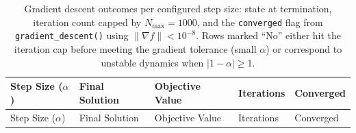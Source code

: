 \documentclass[
]{article}
\begin{document}
\begin{longtable}[]{@{}
  >{\raggedright\arraybackslash}p{}
  >{\raggedright\arraybackslash}p{}
  >{\raggedright\arraybackslash}p{}
  >{\raggedright\arraybackslash}p{}
  >{\raggedright\arraybackslash}p{}@{}}
\caption{Gradient descent outcomes per configured step size: state at
termination, iteration count capped by \(N_{\max} = 1000\), and the
\protect\texttt{converged} flag from
\protect\texttt{gradient\_descent()} using \(\|\nabla f\| < 10^{-8}\).
Rows marked ``No'' either hit the iteration cap before meeting the
gradient tolerance (small \(\alpha\)) or correspond to unstable dynamics
when \(|1-\alpha| \geq 1\). \label{tab:opt_results}}\tabularnewline
\toprule\noalign{}
\begin{minipage}[b]{\linewidth}\raggedright
Step Size (\texorpdfstring{\ensuremath{\alpha}}{alpha})
\end{minipage} & \begin{minipage}[b]{\linewidth}\raggedright
Final Solution
\end{minipage} & \begin{minipage}[b]{\linewidth}\raggedright
Objective Value
\end{minipage} & \begin{minipage}[b]{\linewidth}\raggedright
Iterations
\end{minipage} & \begin{minipage}[b]{\linewidth}\raggedright
Converged
\end{minipage} \\
\midrule\noalign{}
\endfirsthead
\toprule\noalign{}
\begin{minipage}[b]{\linewidth}\raggedright
Step Size (\texorpdfstring{\ensuremath{\alpha}}{alpha})
\end{minipage} & \begin{minipage}[b]{\linewidth}\raggedright
Final Solution
\end{minipage} & \begin{minipage}[b]{\linewidth}\raggedright
Objective Value
\end{minipage} & \begin{minipage}[b]{\linewidth}\raggedright
Iterations
\end{minipage} & \begin{minipage}[b]{\linewidth}\raggedright
Converged
\end{minipage} \\

\end{longtable}
\end{document}
